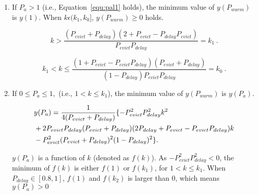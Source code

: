 \begin{enumerate}


  \item If $P_{a} > 1$ (i.e., Equation~\ref{equ:pal1} holds), the minimum value of $y(P_{warm})$ is $y(1)$.
  When $k \epsilon (k_{1}, k_{0}]$, $y(P_{warm}) \geq 0$ holds.
  \begin{footnotesize}
    \begin{equation}
    \label{equ:pal1}
    k > \frac{(P_{evict}+P_{delay})(2+P_{evict}-P_{delay}P_{evict})}{P_{evict}P_{delay}} = k_{1} \ .
  \end{equation}
  \end{footnotesize}
  \begin{footnotesize}
  \begin{equation}
   k_{1} < k \leq \frac{(1 + P_{evict}- P_{evict}P_{delay})(P_{evict}+P_{delay})}{(1 - P_{delay})P_{evict}P_{delay}} = k_{0}\ .
  \end{equation}
  \end{footnotesize}


  \item If $0 \leq P_{a} \leq 1,$ (i.e., $1 < k \leq k_{1}$), the minimum value of $y(P_{warm})$ is $y(P_{a})$.
  \begin{scriptsize}
  \begin{equation}\begin{split}
    \scriptsize
    &y(P_{a}) = \frac{1}{4(P_{evict}+P_{delay})}\{-P_{evict}^{2}P_{delay}^{2}k^{2}\\ &+ 2P_{evict}P_{delay}(P_{evict}+P_{delay})(2P_{delay}+P_{evict}-P_{evict}P_{delay})k\\ & - P_{evict}^{2}(P_{evict}+P_{delay})^{2}(1-P_{delay})^{2}\}.
  \end{split}\end{equation}
\end{scriptsize}
 $y(P_{a})$ is a function of $k$ (denoted as $f(k)$). As $-P_{evict}^{2}P_{delay}^{2} < 0$, the minimum of $f(k)$ is either $f(1)$ or $f(k_{1})$, for $1 < k \leq k_{1}$. When $P_{delay} \in [0.8,1]$, $f(1)$ and  $f(k_{2})$ is larger than $0$, which means $y(P_{a}) > 0$


\end{enumerate}
